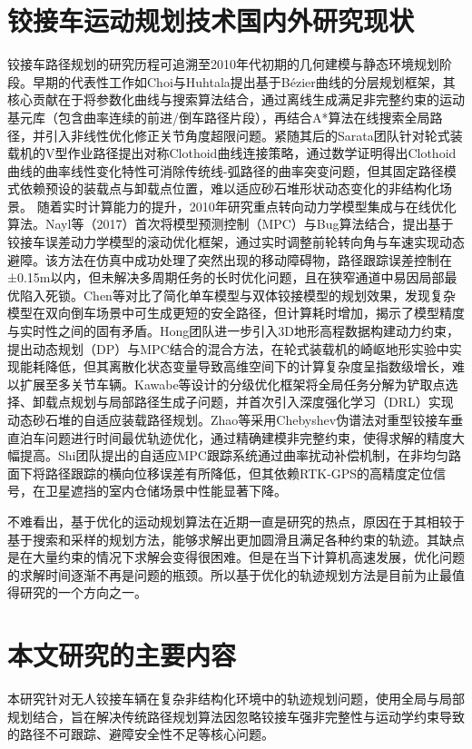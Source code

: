 \documentclass[master,academic]{ysuthesis} %
\begin{document}
	\section{铰接车运动规划技术国内外研究现状}
	铰接车路径规划的研究历程可追溯至2010年代初期的几何建模与静态环境规划阶段。早期的代表性工作如Choi与Huhtala提出基于Bézier曲线的分层规划框架，其核心贡献在于将参数化曲线与搜索算法结合，通过离线生成满足非完整约束的运动基元库（包含曲率连续的前进/倒车路径片段），再结合A*算法在线搜索全局路径，并引入非线性优化修正关节角度超限问题。紧随其后的Sarata团队针对轮式装载机的V型作业路径提出对称Clothoid曲线连接策略，通过数学证明得出Clothoid曲线的曲率线性变化特性可消除传统线-弧路径的曲率突变问题，但其固定路径模式依赖预设的装载点与卸载点位置，难以适应砂石堆形状动态变化的非结构化场景。 随着实时计算能力的提升，2010年研究重点转向动力学模型集成与在线优化算法。Nayl等（2017）首次将模型预测控制（MPC）与Bug算法结合，提出基于铰接车误差动力学模型的滚动优化框架，通过实时调整前轮转向角与车速实现动态避障。该方法在仿真中成功处理了突然出现的移动障碍物，路径跟踪误差控制在±0.15m以内，但未解决多周期任务的长时优化问题，且在狭窄通道中易因局部最优陷入死锁。Chen等对比了简化单车模型与双体铰接模型的规划效果，发现复杂模型在双向倒车场景中可生成更短的安全路径，但计算耗时增加，揭示了模型精度与实时性之间的固有矛盾。Hong团队进一步引入3D地形高程数据构建动力约束，提出动态规划（DP）与MPC结合的混合方法，在轮式装载机的崎岖地形实验中实现能耗降低，但其离散化状态变量导致高维空间下的计算复杂度呈指数级增长，难以扩展至多关节车辆。Kawabe等设计的分级优化框架将全局任务分解为铲取点选择、卸载点规划与局部路径生成子问题，并首次引入深度强化学习（DRL）实现动态砂石堆的自适应装载路径规划。Zhao等采用Chebyshev伪谱法对重型铰接车垂直泊车问题进行时间最优轨迹优化，通过精确建模非完整约束，使得求解的精度大幅提高。Shi团队提出的自适应MPC跟踪系统通过曲率扰动补偿机制，在非均匀路面下将路径跟踪的横向位移误差有所降低，但其依赖RTK-GPS的高精度定位信号，在卫星遮挡的室内仓储场景中性能显著下降。

	不难看出，基于优化的运动规划算法在近期一直是研究的热点，原因在于其相较于基于搜索和采样的规划方法，能够求解出更加圆滑且满足各种约束的轨迹。其缺点是在大量约束的情况下求解会变得很困难。但是在当下计算机高速发展，优化问题的求解时间逐渐不再是问题的瓶颈。所以基于优化的轨迹规划方法是目前为止最值得研究的一个方向之一。

	\section{本文研究的主要内容}
	本研究针对无人铰接车辆在复杂非结构化环境中的轨迹规划问题，使用全局与局部规划结合，旨在解决传统路径规划算法因忽略铰接车强非完整性与运动学约束导致的路径不可跟踪、避障安全性不足等核心问题。
\end{document}
